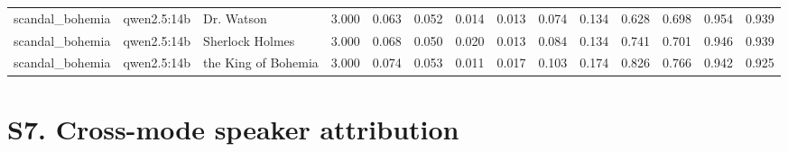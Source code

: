 \documentclass[10pt]{article}
\begin{document}
{\begin{longtable}{lllrrrrrrrrrrr}
scandal\_bohemia & qwen2.5:14b & Dr. Watson & 3.000 & 0.063 & 0.052 & 0.014 & 0.013 & 0.074 & 0.134 & 0.628 & 0.698 & 0.954 & 0.939 \\
scandal\_bohemia & qwen2.5:14b & Sherlock Holmes & 3.000 & 0.068 & 0.050 & 0.020 & 0.013 & 0.084 & 0.134 & 0.741 & 0.701 & 0.946 & 0.939 \\
scandal\_bohemia & qwen2.5:14b & the King of Bohemia & 3.000 & 0.074 & 0.053 & 0.011 & 0.017 & 0.103 & 0.174 & 0.826 & 0.766 & 0.942 & 0.925 \\
\bottomrule
\end{longtable}
}


\section*{S7. Cross-mode speaker attribution}
\end{document}
